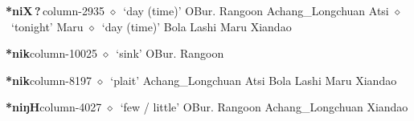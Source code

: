   \item {\footnotesize \textbf{*niX\,?\,}}{\tiny column-2935}
         $\diamond$~`day (time)'
         OBur. 
\hspace{1ex}
         Rangoon 
\hspace{1ex}
         Achang\_Longchuan 
\hspace{1ex}
         Atsi 
\hspace{1ex}
         $\diamond$~`tonight'
         Maru 
\hspace{1ex}
         $\diamond$~`day (time)'
         Bola 
\hspace{1ex}
         Lashi 
\hspace{1ex}
         Maru 
\hspace{1ex}
         Xiandao 
  \item {\footnotesize \textbf{*nik}}{\tiny column-10025}
         $\diamond$~`sink'
         OBur. 
\hspace{1ex}
         Rangoon 
  \item {\footnotesize \textbf{*nik}}{\tiny column-8197}
         $\diamond$~`plait'
         Achang\_Longchuan 
\hspace{1ex}
         Atsi 
\hspace{1ex}
         Bola 
\hspace{1ex}
         Lashi 
\hspace{1ex}
         Maru 
\hspace{1ex}
         Xiandao 
  \item {\footnotesize \textbf{*niŋH}}{\tiny column-4027}
         $\diamond$~`few / little'
         OBur. 
\hspace{1ex}
         Rangoon 
\hspace{1ex}
         Achang\_Longchuan 
\hspace{1ex}
         Xiandao 

